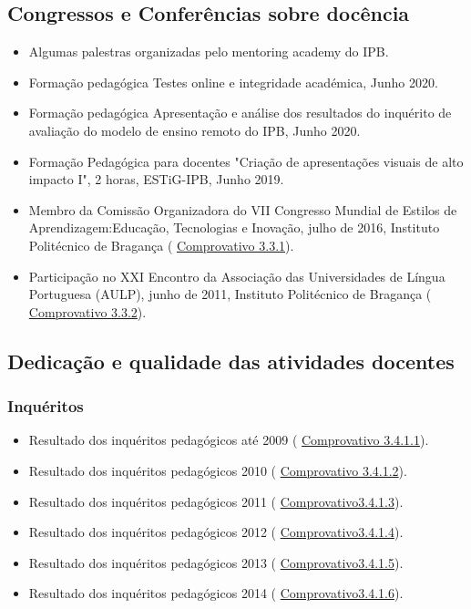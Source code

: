 \documentclass[11pt]{article}
\begin{document}
\subsection{Congressos e Conferências sobre docência}
\begin{itemize}
\item{Algumas palestras organizadas pelo mentoring academy do IPB.}
\item{Formação pedagógica Testes online e integridade académica, Junho 2020.}
\item{Formação pedagógica Apresentação e análise dos resultados do inquérito de avaliação do modelo de ensino remoto do IPB, Junho 2020.}
\item{Formação Pedagógica para docentes "Criação de apresentações visuais de alto impacto I", 2 horas, ESTiG-IPB, Junho 2019.}
\item{Membro da Comissão Organizadora do VII Congresso Mundial de Estilos de Aprendizagem:Educação, Tecnologias e Inovação, julho de 2016, Instituto Politécnico de Bragança (
\href{run:CongressoDocencia/cmea2016.pdf}{Comprovativo 3.3.1}).}
\item{Participação no XXI Encontro da Associação das Universidades de Língua Portuguesa (AULP), junho de 2011, Instituto Politécnico de Bragança (
\href{run:CongressoDocencia/AULP.pdf}{Comprovativo 3.3.2}).}
\end{itemize}
\subsection{Dedicação e qualidade das atividades docentes}
\subsubsection{Inquéritos}
\begin{itemize}
\item{Resultado dos inquéritos pedagógicos até 2009 (
\href{run:Inqueritos/inqueritosATE2009.pdf}{Comprovativo 3.4.1.1}).}
\item{Resultado dos inquéritos pedagógicos 2010 (
\href{run:Inqueritos/relatorioPedagogico2010.pdf}{Comprovativo 3.4.1.2}).}
\item{Resultado dos inquéritos pedagógicos 2011 (
\href{run:Inqueritos/relatorioPedagogico2011.pdf}{Comprovativo3.4.1.3}).}
\item{Resultado dos inquéritos pedagógicos 2012 (
\href{run:Inqueritos/relatorioPedagogico2012.pdf}{Comprovativo3.4.1.4}).}
\item{Resultado dos inquéritos pedagógicos 2013 (
\href{run:Inqueritos/relatorioPedagogico2013.pdf}{Comprovativo3.4.1.5}).}
\item{Resultado dos inquéritos pedagógicos 2014 (
\href{run:Inqueritos/relatorioPedagogico2014.pdf}{Comprovativo3.4.1.6}).}
\end{itemize}
\end{document}
